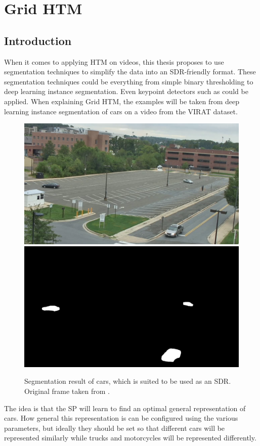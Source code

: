 \chapter{Grid HTM}
\section{Introduction}
When it comes to applying HTM on videos, this thesis proposes to use segmentation techniques to simplify the data into an SDR-friendly format. These segmentation techniques could be everything from simple binary thresholding to deep learning instance segmentation. Even keypoint detectors such as \cite{orb_detector} could be applied. When explaining Grid HTM, the examples will be taken from deep learning instance segmentation of cars on a video from the VIRAT \cite{VIRAT} dataset.
\begin{figure}[H]
    \centering
    \includegraphics[width=.45\textwidth]{resources/methodology/original.png}
    \includegraphics[width=.45\textwidth]{resources/methodology/car_segmentation.png}
    \caption{Segmentation result of cars, which is suited to be used as an SDR. Original frame taken from \cite{VIRAT}.}
\end{figure}
The idea is that the SP will learn to find an optimal general representation of cars. How general this representation is can be configured using the various parameters, but ideally they should be set so that different cars will be represented similarly while trucks and motorcycles will be represented differently.
